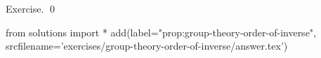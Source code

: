 
\begin{prop}
  \label{prop:group-theory-order-of-inverse}
  
\end{prop}
\proof
Exercise.
\qed
\begin{python0}
from solutions import *
add(label="prop:group-theory-order-of-inverse",
    srcfilename='exercises/group-theory-order-of-inverse/answer.tex') 
\end{python0}
